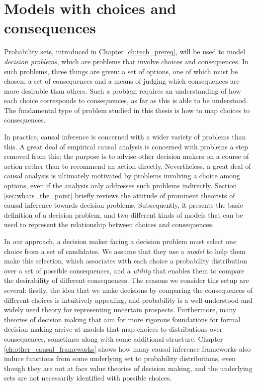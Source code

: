 

\chapter{Models with choices and consequences}\label{ch:2p_statmodels}

Probability sets, introduced in Chapter \ref{ch:tech_prereq}, will be used to model \emph{decision problems}, which are problems that involve choices and consequences. In such problems, three things are given: a set of options, one of which must be chosen, a set of consequences and a means of judging which consequences are more desirable than others. Such a problem requires an understanding of how each choice corresponds to consequences, as far as this is able to be understood. The fundamental type of problem studied in this thesis is how to map choices to consequences. 

In practice, causal inference is concerned with a wider variety of problems than this. A great deal of empirical causal analysis is concerned with problems a step removed from this: the purpose is to advise other decision makers on a course of action rather than to recommend an action directly. Nevertheless, a great deal of causal analysis is ultimately motivated by problems involving a choice among options, even if the analysis only addresses such problems indirectly. Section \ref{sec:whats_the_point} briefly reviews the attitude of prominent theorists of causal inference towards decision problems. Subsequently, it presents the basic definition of a decision problem, and two different kinds of models that can be used to represent the relationship between choices and consequences.

In our approach, a decision maker facing a decision problem must select one choice from a set of candidates. We assume that they use a \emph{model} to help them make this selection, which associates with each choice a probability distribution over a set of possible consequences, and a \emph{utility} that enables them to compare the desirability of different consequences. The reasons we consider this setup are several: firstly, the idea that we make decisions by comparing the consequences of different choices is intuitively appealing, and probability is a well-understood and widely used theory for representing uncertain prospects. Furthermore, many theories of decision making that aim for more rigorous foundations for formal decision making arrive at models that map choices to distributions over consequences, sometimes along with some additional structure. Chapter \ref{ch:other_causal_frameworks} shows how many causal inference frameworks also induce functions from some underlying set to probability distributions, even though they are not at face value theories of decision making, and the underlying sets are not necessarily identified with possible choices. 

